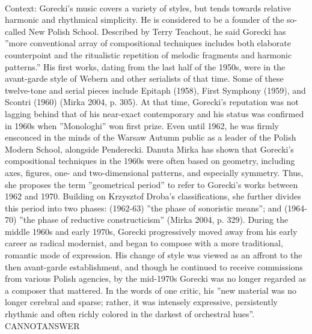 \documentclass[11pt,a4paper, onecolumn]{article}
\begin{document}
\\ Context: Gorecki's music covers a variety of styles, but tends towards relative harmonic and rhythmical simplicity. He is considered to be a founder of the so-called New Polish School. Described by Terry Teachout, he said Gorecki has ''more conventional array of compositional techniques includes both elaborate counterpoint and the ritualistic repetition of melodic fragments and harmonic patterns.'' His first works, dating from the last half of the 1950s, were in the avant-garde style of Webern and other serialists of that time. Some of these twelve-tone and serial pieces include Epitaph (1958), First Symphony (1959), and Scontri (1960) (Mirka 2004, p. 305). At that time, Gorecki's reputation was not lagging behind that of his near-exact contemporary and his status was confirmed in 1960s when ''Monologhi'' won first prize. Even until 1962, he was firmly ensconced in the minds of the Warsaw Autumn public as a leader of the Polish Modern School, alongside Penderecki. Danuta Mirka has shown that Gorecki's compositional techniques in the 1960s were often based on geometry, including axes, figures, one- and two-dimensional patterns, and especially symmetry. Thus, she proposes the term ''geometrical period'' to refer to Gorecki's works between 1962 and 1970. Building on Krzysztof Droba's classifications, she further divides this period into two phases: (1962-63) ''the phase of sonoristic means''; and (1964-70) ''the phase of reductive constructicism'' (Mirka 2004, p. 329). During the middle 1960s and early 1970s, Gorecki progressively moved away from his early career as radical modernist, and began to compose with a more traditional, romantic mode of expression. His change of style was viewed as an affront to the then avant-garde establishment, and though he continued to receive commissions from various Polish agencies, by the mid-1970s Gorecki was no longer regarded as a composer that mattered. In the words of one critic, his ''new material was no longer cerebral and sparse; rather, it was intensely expressive, persistently rhythmic and often richly colored in the darkest of orchestral hues''. CANNOTANSWER
\end{document}
